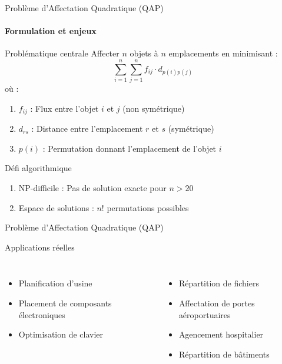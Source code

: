 \documentclass[10pt, handout]{beamer}
\begin{document}
\begin{frame}{Problème d'Affectation Quadratique (QAP)}
    \framesubtitle{Formulation et enjeux}

    \begin{block}{Problématique centrale}
        Affecter \( n \) objets à \( n \) emplacements en minimisant :
        \[
            \sum_{i=1}^n \sum_{j=1}^n f_{ij} \cdot d_{p(i)p(j)}
        \]
        où :
        \begin{enumerate}
            \item \( f_{ij} \) : Flux entre l'objet \( i \) et \( j \) (non symétrique)
            \item \( d_{rs} \) : Distance entre l'emplacement \( r \) et \( s \) (symétrique)
            \item \( p(i) \) : Permutation donnant l'emplacement de l'objet \( i \)
        \end{enumerate}
    \end{block}

    \begin{exampleblock}{Défi algorithmique}
        \begin{enumerate}
            \item NP-difficile : Pas de solution exacte pour \( n > 20 \)
            \item Espace de solutions : \( n! \) permutations possibles
        \end{enumerate}
    \end{exampleblock}
\end{frame}

\begin{frame}{Problème d'Affectation Quadratique (QAP)}
    \begin{alertblock}{Applications réelles}
        \begin{columns}
            \begin{itemize}
                \item Planification d'usine
                \item Placement de composants électroniques
                \item Optimisation de clavier
            \end{itemize}

            \begin{itemize}
                \item Répartition de fichiers
                \item Affectation de portes aéroportuaires
                \item Agencement hospitalier
                \item Répartition de bâtiments
            \end{itemize}
        \end{columns}
    \end{alertblock}
\end{frame}
\end{document}

